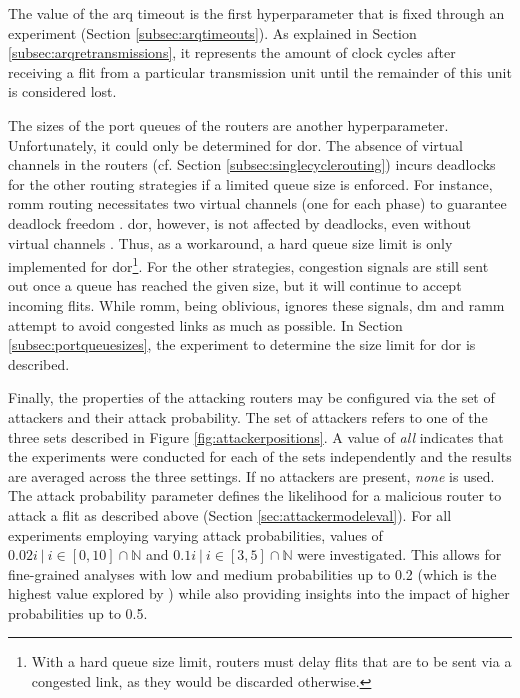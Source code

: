 The value of the \gls{arq} timeout is the first hyperparameter that is fixed through an experiment (Section \ref{subsec:arqtimeouts}). As explained in
Section \ref{subsec:arqretransmissions}, it represents the amount of clock cycles after receiving a flit from a particular transmission unit until the
remainder of this unit is considered lost.

The sizes of the port queues of the routers are another hyperparameter. Unfortunately, it could only be determined for \gls{dor}. The absence of
virtual channels in the routers (cf. Section \ref{subsec:singlecyclerouting}) incurs deadlocks for the other routing strategies if a limited queue
size is enforced. For instance, \gls{romm} routing necessitates two virtual channels (one for each phase) to guarantee deadlock freedom
\cite[4]{nesson95romm}. \Gls{dor}, however, is not affected by deadlocks, even without virtual channels \cite[9]{ni93routingsurvey}. Thus, as a
workaround, a hard queue size limit is only implemented for \gls{dor}\footnote{With a hard queue size limit, routers must delay flits that are
to be sent via a congested link, as they would be discarded otherwise.}. For the other strategies, congestion signals are still sent out once a queue
has reached the given size, but it will continue to accept incoming flits. While \gls{romm}, being oblivious, ignores these signals, \gls{dm} and
\gls{ramm} attempt to avoid congested links as much as possible. In Section \ref{subsec:portqueuesizes}, the experiment to determine the size limit
for \gls{dor} is described.

Finally, the properties of the attacking routers may be configured via the set of attackers and their attack probability. The set of attackers refers
to one of the three sets described in Figure \ref{fig:attackerpositions}. A value of \textit{all} indicates that the experiments were conducted for
each of the sets independently and the results are averaged across the three settings. If no attackers are present, \textit{none} is used. The attack
probability parameter defines the likelihood for a malicious router to attack a flit as described above (Section \ref{sec:attackermodeleval}). For all
experiments employing varying attack probabilities, values of $0.02i\ |\ i \in [0, 10] \cap \mathbb{N}$ and $0.1i\ |\ i \in [3, 5] \cap \mathbb{N}$
were investigated. This allows for fine-grained analyses with low and medium probabilities up to 0.2 (which is the highest value explored by
\citeauthor{moriam18activeattackers} \cite{moriam18activeattackers}) while also providing insights into the impact of higher probabilities up to 0.5.

